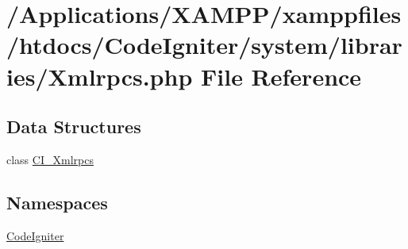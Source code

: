 \hypertarget{_xmlrpcs_8php}{}\section{/\+Applications/\+X\+A\+M\+P\+P/xamppfiles/htdocs/\+Code\+Igniter/system/libraries/\+Xmlrpcs.php File Reference}
\label{_xmlrpcs_8php}
\subsection*{Data Structures}
\begin{DoxyCompactItemize}
\item 
class \mbox{\hyperlink{class_c_i___xmlrpcs}{C\+I\+\_\+\+Xmlrpcs}}
\end{DoxyCompactItemize}
\subsection*{Namespaces}
\begin{DoxyCompactItemize}
\item 
 \mbox{\hyperlink{namespace_code_igniter}{Code\+Igniter}}
\end{DoxyCompactItemize}
